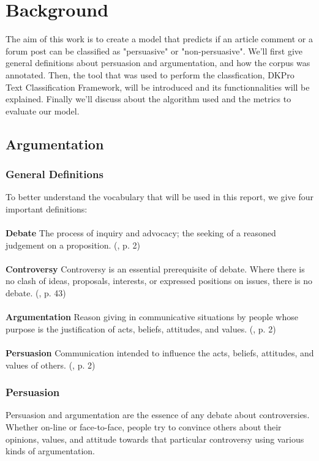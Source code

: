 \chapter{Background}  %
The aim of this work is to create a model that predicts if an article comment or a forum post can be classified as "persuasive" or "non-persuasive". We'll first give general definitions about persuasion and argumentation, and how the corpus was annotated. Then, the tool that was used to perform the classfication, DKPro Text Classification Framework, will be introduced and its functionnalities will be explained. Finally we'll discuss about the algorithm used and the metrics to evaluate our model.
\section{Argumentation}  %
\subsection{General Definitions}
To better understand the vocabulary that will be used in this report, we give four important definitions:
\\
\\
\textbf{Debate} The process of inquiry and advocacy; the seeking of a reasoned judgement on a proposition. (\cite{freeley2000argumentation}, p. 2)
\\
\\
\textbf{Controversy} Controversy is an essential prerequisite of debate. Where there is no clash of ideas,
proposals, interests, or expressed positions on issues, there is no debate. (\cite{freeley2000argumentation}, p. 43)
\\
\\
\textbf{Argumentation} Reason giving in communicative situations by people whose purpose is the justification of acts, beliefs, attitudes, and values. (\cite{freeley2000argumentation}, p. 2)
\\
\\
\textbf{Persuasion} Communication intended to influence the acts, beliefs, attitudes, and values of others. (\cite{freeley2000argumentation}, p. 2)

\subsection{Persuasion}
Persuasion and argumentation are the essence of any debate about controversies. Whether on-line or face-to-face, people try to convince others about their opinions, values, and attitude towards that particular controversy using various kinds of argumentation.

